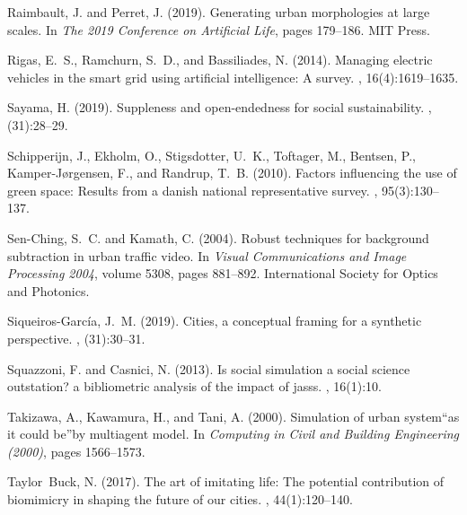 \documentclass[letterpaper]{article}
\begin{document}
\begin{thebibliography}{}
Raimbault, J. and Perret, J. (2019).
\newblock Generating urban morphologies at large scales.
\newblock In {\em The 2019 Conference on Artificial Life}, pages 179--186. MIT
  Press.

Rigas, E.~S., Ramchurn, S.~D., and Bassiliades, N. (2014).
\newblock Managing electric vehicles in the smart grid using artificial
  intelligence: A survey.
,
  16(4):1619--1635.

Sayama, H. (2019).
\newblock Suppleness and open-endedness for social sustainability.
, (31):28--29.

Schipperijn, J., Ekholm, O., Stigsdotter, U.~K., Toftager, M., Bentsen, P.,
  Kamper-J{\o}rgensen, F., and Randrup, T.~B. (2010).
\newblock Factors influencing the use of green space: Results from a danish
  national representative survey.
, 95(3):130--137.

Sen-Ching, S.~C. and Kamath, C. (2004).
\newblock Robust techniques for background subtraction in urban traffic video.
\newblock In {\em Visual Communications and Image Processing 2004}, volume
  5308, pages 881--892. International Society for Optics and Photonics.

Siqueiros-García, J.~M. (2019).
\newblock Cities, a conceptual framing for a synthetic perspective.
, (31):30--31.

Squazzoni, F. and Casnici, N. (2013).
\newblock Is social simulation a social science outstation? a bibliometric
  analysis of the impact of jasss.
,
  16(1):10.

Takizawa, A., Kawamura, H., and Tani, A. (2000).
\newblock Simulation of urban system``as it could be''by multiagent model.
\newblock In {\em Computing in Civil and Building Engineering (2000)}, pages
  1566--1573.

Taylor~Buck, N. (2017).
\newblock The art of imitating life: The potential contribution of biomimicry
  in shaping the future of our cities.
,
  44(1):120--140.


\end{thebibliography}
\end{document}
